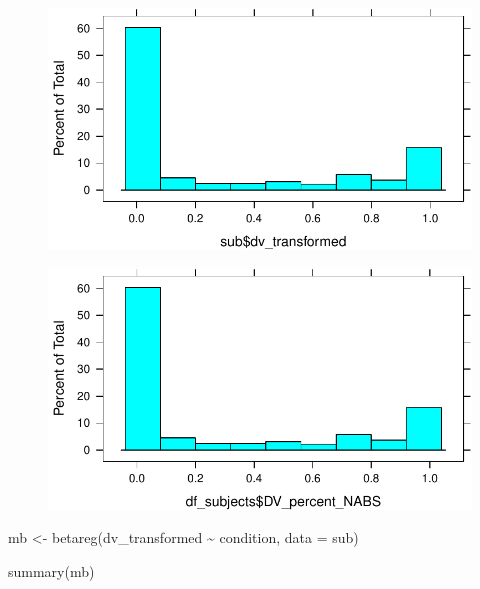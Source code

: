 \documentclass[
  letterpaper,
  DIV=11,
  numbers=noendperiod]{scrreprt}
\newenvironment{Shaded}{\begin{snugshade}}{\end{snugshade}}
\newcommand{\AttributeTok}[1]{\textcolor[rgb]{0.40,0.45,0.13}{#1}}
\newcommand{\FunctionTok}[1]{\textcolor[rgb]{0.28,0.35,0.67}{#1}}
\newcommand{\NormalTok}[1]{\textcolor[rgb]{0.00,0.23,0.31}{#1}}
\newcommand{\OtherTok}[1]{\textcolor[rgb]{0.00,0.23,0.31}{#1}}
\newcommand{\SpecialCharTok}[1]{\textcolor[rgb]{0.37,0.37,0.37}{#1}}
\begin{document}
\begin{figure}[H]

{\centering \includegraphics{analysis/SGC3A/4_sgc3A_hypotesting_files/figure-pdf/unnamed-chunk-3-1.pdf}

}

\end{figure}

\begin{Shaded}
\end{Shaded}

\begin{figure}[H]

{\centering \includegraphics{analysis/SGC3A/4_sgc3A_hypotesting_files/figure-pdf/unnamed-chunk-3-2.pdf}

}

\end{figure}

\begin{Shaded}
\begin{Highlighting}[]
\NormalTok{mb }\OtherTok{\textless{}{-}} \FunctionTok{betareg}\NormalTok{(dv\_transformed }\SpecialCharTok{\textasciitilde{}}\NormalTok{ condition, }\AttributeTok{data =}\NormalTok{ sub)}

\FunctionTok{summary}\NormalTok{(mb)}
\end{Highlighting}
\end{Shaded}
\end{document}
